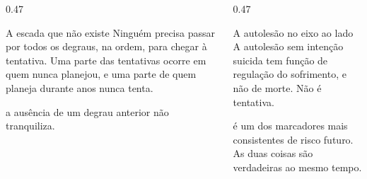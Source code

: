 \begin{frame}{}
\begin{columns}[onlytextwidth, t]
\begin{column}{0.47\textwidth}
\begin{caixaagir}{A escada que n\~ao existe}
Ningu\'em precisa passar por todos os degraus, na ordem, para chegar \`a
tentativa. Uma parte das tentativas ocorre em quem nunca planejou, e uma parte
de quem planeja durante anos nunca tenta.\par
{} a aus\^encia de um degrau anterior n\~ao tranquiliza.
\end{caixaagir}
\end{column}
\calha
\begin{column}{0.47\textwidth}
\begin{caixaavaliar}{A autoles\~ao no eixo ao lado}
A autoles\~ao sem inten\c{c}\~ao suicida tem fun\c{c}\~ao de regula\c{c}\~ao do
sofrimento, e n\~ao de morte. N\~ao \'e tentativa.\par
{} \'e um dos marcadores mais consistentes de risco
futuro. As duas coisas s\~ao verdadeiras ao mesmo tempo.
\end{caixaavaliar}
\end{column}
\end{columns}

\CRvg
\begin{center}
\end{center}
\end{frame}

